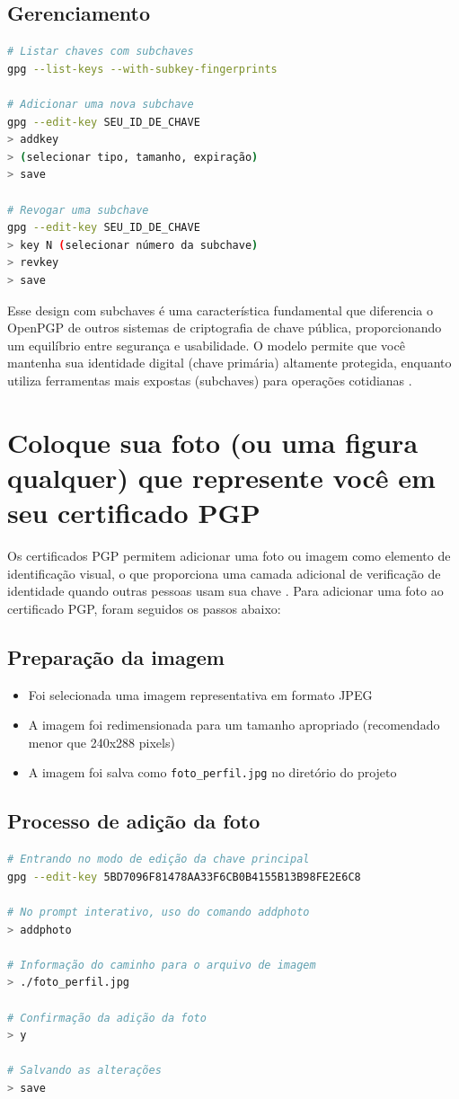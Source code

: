 \subsection{Gerenciamento}
\begin{lstlisting}[language=bash]
# Listar chaves com subchaves
gpg --list-keys --with-subkey-fingerprints

# Adicionar uma nova subchave
gpg --edit-key SEU_ID_DE_CHAVE
> addkey
> (selecionar tipo, tamanho, expiração)
> save

# Revogar uma subchave
gpg --edit-key SEU_ID_DE_CHAVE
> key N (selecionar número da subchave)
> revkey
> save
\end{lstlisting}

Esse design com subchaves é uma característica fundamental que diferencia o OpenPGP de outros sistemas de criptografia de chave pública, proporcionando um equilíbrio entre segurança e usabilidade. O modelo permite que você mantenha sua identidade digital (chave primária) altamente protegida, enquanto utiliza ferramentas mais expostas (subchaves) para operações cotidianas \cite{gnupgprivate}.

\section{Coloque sua foto (ou uma figura qualquer) que represente você em seu certificado PGP}

Os certificados PGP permitem adicionar uma foto ou imagem como elemento de identificação visual, o que proporciona uma camada adicional de verificação de identidade quando outras pessoas usam sua chave \cite{gnupgdoc}. Para adicionar uma foto ao certificado PGP, foram seguidos os passos abaixo:

\subsection{Preparação da imagem}
\begin{itemize}
    \item Foi selecionada uma imagem representativa em formato JPEG
    \item A imagem foi redimensionada para um tamanho apropriado (recomendado menor que 240x288 pixels)
    \item A imagem foi salva como \texttt{foto\_perfil.jpg} no diretório do projeto
\end{itemize}

\subsection{Processo de adição da foto}
\begin{lstlisting}[language=bash]
# Entrando no modo de edição da chave principal
gpg --edit-key 5BD7096F81478AA33F6CB0B4155B13B98FE2E6C8

# No prompt interativo, uso do comando addphoto
> addphoto

# Informação do caminho para o arquivo de imagem
> ./foto_perfil.jpg

# Confirmação da adição da foto
> y

# Salvando as alterações
> save
\end{lstlisting}

